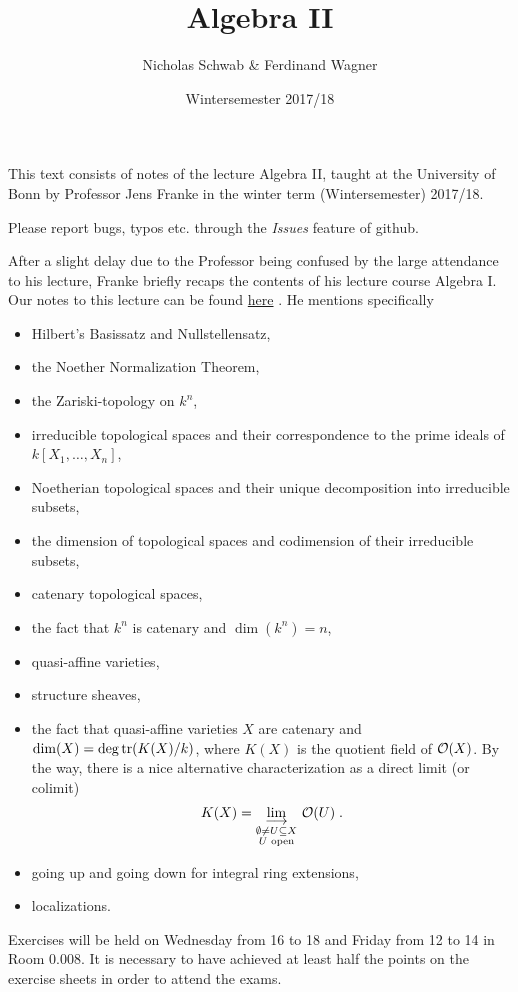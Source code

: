 \documentclass[a4paper,parskip=half,numbers=enddot, DIV=12]{scrreprt}
\title{Algebra II}
\author{Nicholas Schwab \& Ferdinand Wagner}
\date{Wintersemester 2017/18}
\begin{document}
\maketitle
{}
 \thispagestyle{plain}
This text consists of notes of the lecture Algebra II, taught at the University of Bonn by Professor Jens Franke in the winter term (Wintersemester) 2017/18. 

Please report bugs, typos etc. through the \emph{Issues} feature of github.

\tableofcontents

After a slight delay due to the Professor being confused by the large attendance to his lecture, Franke briefly recaps the contents of his lecture course Algebra I. Our notes to this lecture can be found \href{https://github.com/Nicholas42/AlgebraFranke/tree/master/AlgebraI}{here} \cite{alg1}. He mentions specifically
\begin{itemize}
 \item Hilbert's Basissatz and Nullstellensatz,
 \item the Noether Normalization Theorem,
 \item the Zariski-topology on $k^n$,
 \item irreducible topological spaces and their correspondence to the prime ideals of $k[X_1, \ldots, X_n]$,
 \item Noetherian topological spaces and their unique decomposition into irreducible subsets,
 \item the dimension of topological spaces and codimension of their irreducible subsets,
 \item catenary topological spaces,
 \item the fact that $k^n$ is catenary and $\dim(k^n) = n$,
 \item quasi-affine varieties,
 \item structure sheaves,
 \item the fact that quasi-affine varieties $X$ are catenary and $\dim(X) = \deg\operatorname{tr}(K(X)/k)$, where $K(X)$ is the quotient field of $\mathcal{O}(X)$. By the way, there is a nice alternative characterization as a direct limit (or colimit)
 \begin{align*}
 	K(X)=\colimit[\substack{\emptyset\not=U\subseteq X\\U\text{ open}}]\Oo(U)\;.
 \end{align*}
 \item going up and going down for integral ring extensions,
 \item localizations.
\end{itemize}
Exercises will be held on Wednesday from 16 to 18 and Friday from 12 to 14 in Room 0.008. It is necessary to have achieved at least half the points on the exercise sheets in order to attend the exams.
\end{document}
